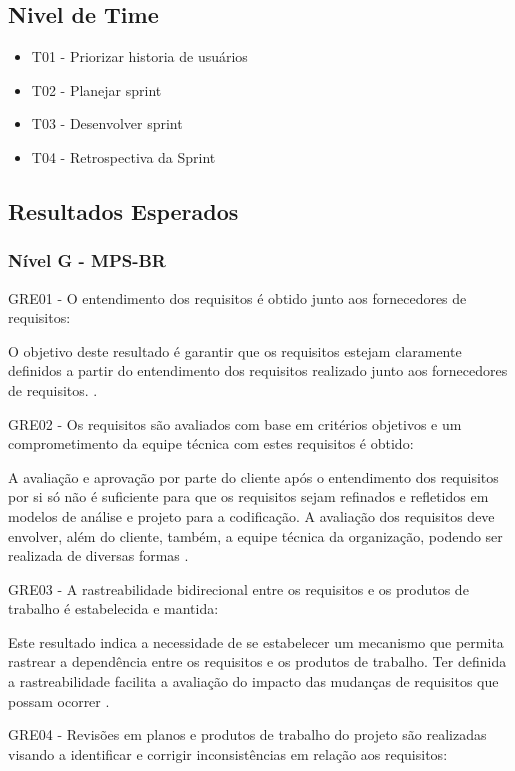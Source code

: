	\subsection{Nivel de Time}
		\begin{itemize}
			\item T01 - Priorizar historia de usuários
			\item T02 - Planejar sprint
			\item T03 - Desenvolver sprint
			\item T04 - Retrospectiva da Sprint
		\end{itemize}

	\subsection{Resultados Esperados}
		\subsubsection{Nível G - MPS-BR}
		GRE01 - O entendimento dos requisitos é obtido junto aos fornecedores de requisitos:

	O objetivo deste resultado é garantir que os requisitos estejam claramente definidos a partir do entendimento
	dos requisitos realizado junto aos fornecedores de requisitos. \cite{guia2012}.

	GRE02 - Os requisitos são avaliados com base em critérios objetivos e um comprometimento da equipe técnica com estes
	requisitos é obtido:

	A avaliação e aprovação por parte do cliente após o entendimento dos requisitos por si só não é suficiente para que os
	requisitos sejam refinados e refletidos em modelos de análise e projeto para a codificação. A avaliação dos requisitos
	deve envolver, além do cliente, também, a equipe técnica da organização, podendo ser realizada de diversas formas
	\cite{guia2012}.

	GRE03 - A rastreabilidade bidirecional entre os requisitos e os produtos de trabalho é estabelecida e mantida:

	Este resultado indica a necessidade de se estabelecer um mecanismo que permita rastrear a dependência entre os requisitos
	e os produtos de trabalho. Ter definida a rastreabilidade facilita a avaliação do impacto das mudanças de requisitos que
	possam ocorrer \cite{guia2012}.

	GRE04 - Revisões em planos e produtos de trabalho do projeto são realizadas visando a identificar e corrigir inconsistências
	em relação aos requisitos:

